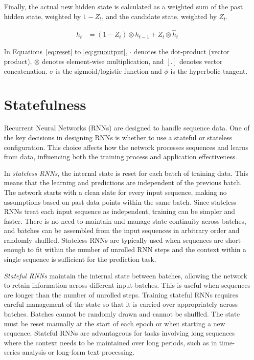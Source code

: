 Finally, the actual new hidden state is calculated as a weighted sum of the past hidden state, weighted by $1-Z_t$, and the candidate state, weighted by $Z_t$.

\begin{align}
h_t &= (1 - Z_t) \otimes h_{t-1} + Z_t \otimes \hat{h}_t \label{eq:gruoutput}
\end{align}

In Equations~\ref{eq:reset} to \ref{eq:gruoutput}, $\cdot$ denotes the dot-product (vector product), $\otimes$ denotes element-wise multiplication, and $[.]$ denotes vector concatenation.  $\sigma$ is the sigmoid/logistic function and $\phi$ is the hyperbolic tangent.

\section{Statefulness}

Recurrent Neural Networks (RNNs) are designed to handle sequence data. One of the key decisions in designing RNNs is whether to use a stateful or stateless configuration. This choice affects how the network processes sequences and learns from data, influencing both the training process and application effectiveness.

In \emph{stateless RNNs}, the internal state is reset for each batch of training data. This means that the learning and predictions are independent of the previous batch. The network starts with a clean slate for every input sequence, making no assumptions based on past data points within the same batch. Since stateless RNNs treat each input sequence as independent, training can be simpler and faster. There is no need to maintain and manage state continuity across batches, and batches can be assembled from the input sequences in arbitrary order and randomly shuffled. Stateless RNNs are typically used when sequences are short enough to fit within the number of unrolled RNN steps and the context within a single sequence is sufficient for the prediction task.

\emph{Stateful RNNs} maintain the internal state between batches, allowing the network to retain information across different input batches. This is useful when sequences are longer than the number of unrolled steps. Training stateful RNNs requires careful management of the state so that it is carried over appropriately across batches. Batches cannot be randomly drawn and cannot be shuffled. The state must be reset manually at the start of each epoch or when starting a new sequence. Stateful RNNs are advantageous for tasks involving long sequences where the context needs to be maintained over long periods, such as in time-series analysis or long-form text processing.

